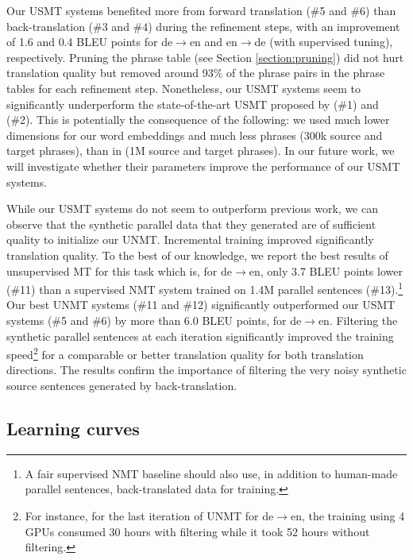 \documentclass[11pt,a4paper]{article}
\begin{document}
Our USMT systems benefited more from forward translation (\#5 and \#6) than back-translation (\#3 and \#4) during the refinement steps, with an improvement of 1.6 and 0.4 BLEU points for de$\rightarrow$en and en$\rightarrow$de (with supervised tuning), respectively. Pruning the phrase table (see Section \ref{section:pruning}) did not hurt translation quality but removed around 93\% of the phrase pairs in the phrase tables for each refinement step. Nonetheless, our USMT systems seem to significantly underperform the state-of-the-art USMT proposed by \citet{DBLP:journals/corr/abs-1804-07755} (\#1) and \citet{artetxe2018unsupervised} (\#2).  This is potentially the consequence of the following: we used much lower dimensions for our word embeddings and much less phrases (300k source and target phrases), than in \citet{artetxe2018unsupervised} (1M source and target phrases). In our future work, we will investigate whether their parameters improve the performance of our USMT systems.


While our USMT systems do not seem to outperform previous work, we can observe that the synthetic parallel data that they generated are of sufficient quality to initialize our UNMT. Incremental training improved significantly translation quality. To the best of our knowledge, we report the best results of unsupervised MT for this task which is, for de$\rightarrow$en, only 3.7 BLEU points lower (\#11) than a supervised NMT system trained on 1.4M parallel sentences (\#13).\footnote{A fair supervised NMT baseline should also use, in addition to human-made parallel sentences, back-translated data for training.} Our best UNMT systems (\#11 and \#12) significantly outperformed our USMT systems (\#5 and \#6) by more than 6.0 BLEU points, for de$\rightarrow$en.
Filtering the synthetic parallel sentences at each iteration significantly improved the training speed\footnote{For instance, for the last iteration of UNMT for de$\rightarrow$en, the training using 4 GPUs consumed 30 hours with filtering while it took 52 hours without filtering.} for a comparable or better translation quality for both translation directions. The results confirm the importance of filtering the very noisy synthetic source sentences generated by back-translation.





\subsection{Learning curves}
\end{document}
